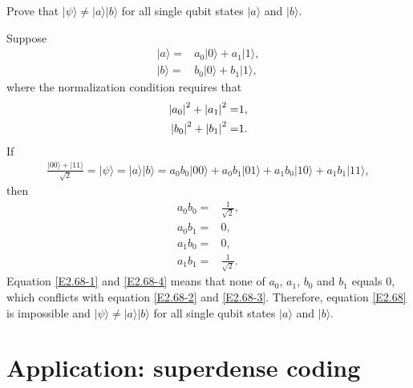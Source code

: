 \documentclass[en]{sol-man}
\begin{document}
\begin{exe}
    Prove that $\lvert\psi\rangle\neq\lvert a\rangle\lvert b\rangle$ for all single qubit states $\lvert a\rangle$ and $\lvert b\rangle$.
\end{exe}
\begin{pf}
    Suppose
    \begin{align}
        \lvert a\rangle=&a_0\lvert 0\rangle+a_1\lvert 1\rangle,\\
        \lvert b\rangle=&b_0\lvert 0\rangle+b_1\lvert 1\rangle,
    \end{align}
    where the normalization condition requires that
    \begin{align}
        \left\lvert a_0\right\rvert^2+\left\lvert a_1\right\rvert^2=&1,\\
        \left\lvert b_0\right\rvert^2+\left\lvert b_1\right\rvert^2=&1.
    \end{align}
    If
    \begin{align}
        \label{E2.68}
        \frac{\lvert 00\rangle+\lvert 11\rangle}{\sqrt{2}}=\lvert\psi\rangle=\lvert a\rangle\lvert b\rangle=a_0b_0\lvert 00\rangle+a_0b_1\lvert 01\rangle+a_1b_0\lvert 10\rangle+a_1b_1\lvert 11\rangle,
    \end{align}
    then
    \begin{align}
        \label{E2.68-1}a_0b_0=&\frac{1}{\sqrt{2}},\\
        \label{E2.68-2}a_0b_1=&0,\\
        \label{E2.68-3}a_1b_0=&0,\\
        \label{E2.68-4}a_1b_1=&\frac{1}{\sqrt{2}}.
    \end{align}
    Equation \eqref{E2.68-1} and \eqref{E2.68-4} means that none of $a_0$, $a_1$, $b_0$ and $b_1$ equals $0$, which conflicts with equation \eqref{E2.68-2} and \eqref{E2.68-3}.
    Therefore, equation \eqref{E2.68} is impossible and $\lvert\psi\rangle\neq\lvert a\rangle\lvert b\rangle$ for all single qubit states $\lvert a\rangle$ and $\lvert b\rangle$.
\end{pf}

\section{Application: superdense coding}
\end{document}
